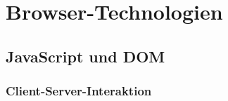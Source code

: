 \section{Browser-Technologien}

\subsection{JavaScript und DOM}

\subsubsection{Client-Server-Interaktion}